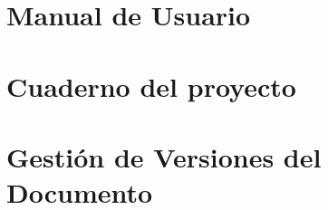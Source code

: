 \documentclass[
    language=spanish,
    school=esdf,
    docstage=final,
    media=paper,
    bookprint=false,
    linkcolor=red!45!black,
    chapterstyle=classic,
    coverstyle=classic,
    aiacknowledgement=true,
    listprefix=false
]{IPLeiriaThesis}
\begin{document}






%
%

\bookmarktocentry\tableofcontents
\listoffigures
\listoftables

\glossarytoc\printnormalglossary
\acronymtoc\printacronymglossary
\symboltoc\printsymbolglossary



\part{Manual de Usuario}






\part{Cuaderno del proyecto}









\part{Gestión de Versiones del Documento}
\end{document}
